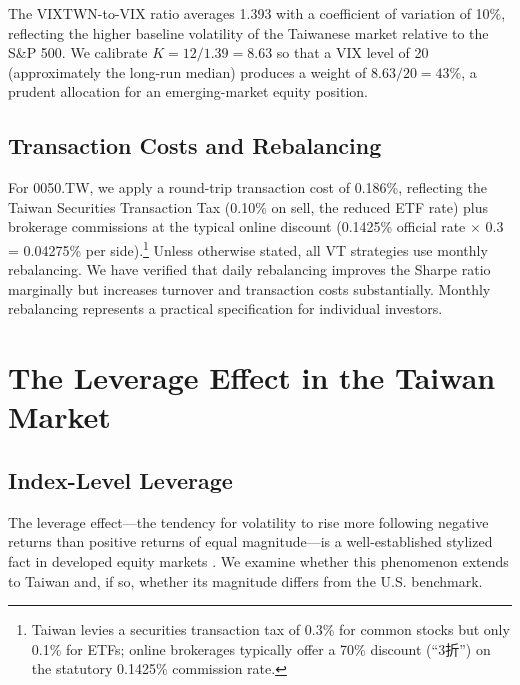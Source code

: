 The VIXTWN-to-VIX ratio averages 1.393 with a coefficient of variation of 10\%, reflecting the higher baseline volatility of the Taiwanese market relative to the S\&P 500. We calibrate $K = 12 / 1.39 = 8.63$ so that a VIX level of 20 (approximately the long-run median) produces a weight of $8.63/20 = 43\%$, a prudent allocation for an emerging-market equity position.

\subsection{Transaction Costs and Rebalancing}

For 0050.TW, we apply a round-trip transaction cost of 0.186\%, reflecting the Taiwan Securities Transaction Tax (0.10\% on sell, the reduced ETF rate) plus brokerage commissions at the typical online discount (0.1425\% official rate $\times$ 0.3 = 0.04275\% per side).\footnote{Taiwan levies a securities transaction tax of 0.3\% for common stocks but only 0.1\% for ETFs; online brokerages typically offer a 70\% discount (``3折'') on the statutory 0.1425\% commission rate.} Unless otherwise stated, all VT strategies use monthly rebalancing. We have verified that daily rebalancing improves the Sharpe ratio marginally but increases turnover and transaction costs substantially. Monthly rebalancing represents a practical specification for individual investors.



\section{The Leverage Effect in the Taiwan Market}
\label{sec:leverage}

\subsection{Index-Level Leverage}

The leverage effect---the tendency for volatility to rise more following negative returns than positive returns of equal magnitude---is a well-established stylized fact in developed equity markets \citep{black1976,christie1982,nelson1991,glosten1993}. We examine whether this phenomenon extends to Taiwan and, if so, whether its magnitude differs from the U.S. benchmark.

